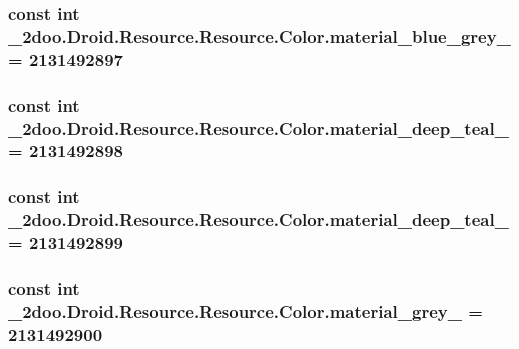 \hypertarget{class__2doo_1_1_droid_1_1_resource_1_1_color_8526fd1495df57e821c5e60588dcb5a1}{
\subsubsection[{material\_\-blue\_\-grey\_\-950}]{\setlength{\rightskip}{0pt plus 5cm}const int \_\-2doo.Droid.Resource.Resource.Color.material\_\-blue\_\-grey\_ = 2131492897}}
\label{class__2doo_1_1_droid_1_1_resource_1_1_color_8526fd1495df57e821c5e60588dcb5a1}


\hypertarget{class__2doo_1_1_droid_1_1_resource_1_1_color_e7cd338586116696f03ddc8b1ec9c23d}{
\subsubsection[{material\_\-deep\_\-teal\_\-200}]{\setlength{\rightskip}{0pt plus 5cm}const int \_\-2doo.Droid.Resource.Resource.Color.material\_\-deep\_\-teal\_ = 2131492898}}
\label{class__2doo_1_1_droid_1_1_resource_1_1_color_e7cd338586116696f03ddc8b1ec9c23d}


\hypertarget{class__2doo_1_1_droid_1_1_resource_1_1_color_72d97a5b7c27db99ccc139e5e205d7a5}{
\subsubsection[{material\_\-deep\_\-teal\_\-500}]{\setlength{\rightskip}{0pt plus 5cm}const int \_\-2doo.Droid.Resource.Resource.Color.material\_\-deep\_\-teal\_ = 2131492899}}
\label{class__2doo_1_1_droid_1_1_resource_1_1_color_72d97a5b7c27db99ccc139e5e205d7a5}


\hypertarget{class__2doo_1_1_droid_1_1_resource_1_1_color_6ee3cd9f8c9ea6c3ce2b81f4b0515a97}{
\subsubsection[{material\_\-grey\_\-100}]{\setlength{\rightskip}{0pt plus 5cm}const int \_\-2doo.Droid.Resource.Resource.Color.material\_\-grey\_ = 2131492900}}
\label{class__2doo_1_1_droid_1_1_resource_1_1_color_6ee3cd9f8c9ea6c3ce2b81f4b0515a97}



